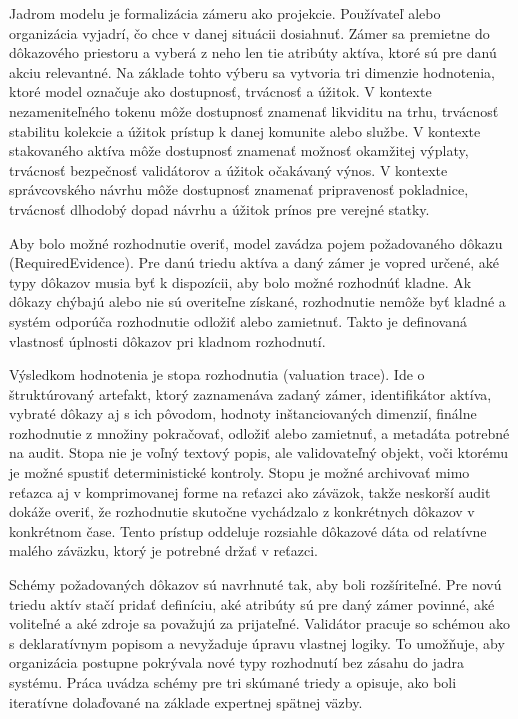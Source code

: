Jadrom modelu je formalizácia zámeru ako projekcie. Používateľ alebo organizácia vyjadrí, čo chce v danej situácii dosiahnuť. Zámer sa premietne do dôkazového priestoru a vyberá z neho len tie atribúty aktíva, ktoré sú pre danú akciu relevantné. Na základe tohto výberu sa vytvoria tri dimenzie hodnotenia, ktoré model označuje ako dostupnosť, trvácnosť a úžitok. V kontexte nezameniteľného tokenu môže dostupnosť znamenať likviditu na trhu, trvácnosť stabilitu kolekcie a úžitok prístup k danej komunite alebo službe. V kontexte stakovaného aktíva môže dostupnosť znamenať možnosť okamžitej výplaty, trvácnosť bezpečnosť validátorov a úžitok očakávaný výnos. V kontexte správcovského návrhu môže dostupnosť znamenať pripravenosť pokladnice, trvácnosť dlhodobý dopad návrhu a úžitok prínos pre verejné statky.

Aby bolo možné rozhodnutie overiť, model zavádza pojem požadovaného dôkazu (RequiredEvidence). Pre danú triedu aktíva a daný zámer je vopred určené, aké typy dôkazov musia byť k dispozícii, aby bolo možné rozhodnúť kladne. Ak dôkazy chýbajú alebo nie sú overiteľne získané, rozhodnutie nemôže byť kladné a systém odporúča rozhodnutie odložiť alebo zamietnuť. Takto je definovaná vlastnosť úplnosti dôkazov pri kladnom rozhodnutí.

Výsledkom hodnotenia je stopa rozhodnutia (valuation trace). Ide o štruktúrovaný artefakt, ktorý zaznamenáva zadaný zámer, identifikátor aktíva, vybraté dôkazy aj s ich pôvodom, hodnoty inštanciovaných dimenzií, finálne rozhodnutie z množiny pokračovať, odložiť alebo zamietnuť, a metadáta potrebné na audit. Stopa nie je voľný textový popis, ale validovateľný objekt, voči ktorému je možné spustiť deterministické kontroly. Stopu je možné archivovať mimo reťazca aj v komprimovanej forme na reťazci ako záväzok, takže neskorší audit dokáže overiť, že rozhodnutie skutočne vychádzalo z konkrétnych dôkazov v konkrétnom čase. Tento prístup oddeluje rozsiahle dôkazové dáta od relatívne malého záväzku, ktorý je potrebné držať v reťazci.

Schémy požadovaných dôkazov sú navrhnuté tak, aby boli rozšíriteľné. Pre novú triedu aktív stačí pridať definíciu, aké atribúty sú pre daný zámer povinné, aké voliteľné a aké zdroje sa považujú za prijateľné. Validátor pracuje so schémou ako s deklaratívnym popisom a nevyžaduje úpravu vlastnej logiky. To umožňuje, aby organizácia postupne pokrývala nové typy rozhodnutí bez zásahu do jadra systému. Práca uvádza schémy pre tri skúmané triedy a opisuje, ako boli iteratívne dolaďované na základe expertnej spätnej väzby.

